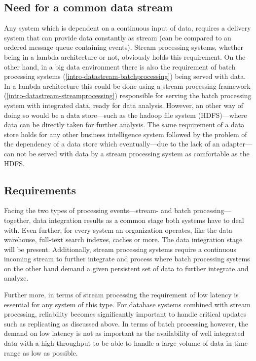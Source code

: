 \subsection{Need for a common data stream}
Any system which is dependent on a continuous input of data, requires a delivery
system that can provide data constantly as stream (can be
compared to an ordered message queue  containing events). Stream
processing systems, whether being in a lambda architecture or not, obviously
holds this requirement. On the other hand, in a big data environment there is
also the requirement of batch processing systems
(\ref{intro-datastream-batchprocessing}) being served with data. In a lambda
architecture this could be done using a stream processing framework
(\ref{intro-datastream-streamprocessing}) responsible for serving the batch
processing system with integrated data, ready for data analysis. However, an
other way of doing so would be a data store---such as the hadoop file system
(HDFS)---where data can be directly taken for further analysis.
The same requirement of a data store holds for any
other business intelligence system followed by the problem of the dependency of
a data store which eventually---due to the lack of an adapter---can not be
served with data by a stream processing system as comfortable as the HDFS.

\subsection{Requirements}
Facing the two types of processing events---stream- and batch
processing---together, data integration results as a common stage both systems
have to deal with. Even further, for every system an organization operates, like
the data warehouse, full-text search indexes, caches or more. The data
integration stage will be present. Additionally, stream processing systems
require a continuous incoming stream to further integrate and process where
batch processing systems on the other hand demand a given persistent set of data
to further integrate and analyze.

Further more, in terms of stream processing the requirement of low latency is
essential for any system of this type. For database systems combined with stream
processing, reliability becomes significantly important to handle critical
updates such as replicating as discussed above. In terms of batch processing
however, the demand on low latency is not as important as the availability of
well integrated data with a high throughput to be able to handle a large volume
of data in time range as low as possible.

